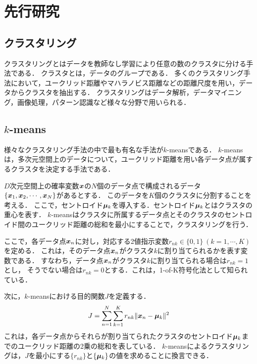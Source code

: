 \section{先行研究}

\subsection{クラスタリング}
クラスタリングとはデータを教師なし学習により任意の数のクラスタに分ける手法である．
クラスタとは，データのグループである．
多くのクラスタリング手法において，ユークリッド距離やマハラノビス距離などの距離尺度を用い，データからクラスタを抽出する．
クラスタリングはデータ解析，データマイニング，画像処理，パターン認識など様々な分野で用いられる．

\subsection{$k$-means}
様々なクラスタリング手法の中で最も有名な手法が$k$-meansである．
$k$-means\cite{k-means}は，多次元空間上のデータについて，ユークリッド距離を用い各データ点が属するクラスタを決定する手法である．

$D$次元空間上の確率変数$\boldsymbol{x}$の$N$個のデータ点で構成されるデータ
$\{\boldsymbol{x}_1, \boldsymbol{x}_2, \cdots, \boldsymbol{x}_N\}$があるとする．
このデータを$K$個のクラスタに分割することを考える．
ここで，セントロイド$\boldsymbol{\mu}_k$を導入する．セントロイド$\boldsymbol{\mu}_k$とはクラスタの重心を表す．
$k$-meansはクラスタに所属するデータ点とそのクラスタのセントロイド間のユークリッド距離の総和を最小にすることで，クラスタリングを行う．

ここで，各データ点$\boldsymbol{x}_n$に対し，対応する2値指示変数$r_{nk} \in \{0, 1\}\ (k = 1, \cdots, K)$を定める．
これは，そのデータ点$\boldsymbol{x}_n$がクラスタ$k$に割り当てられるかを表す変数である．
すなわち，データ点$\boldsymbol{x}_n$がクラスタ$k$に割り当てられる場合は$r_{nk}=1$とし，
そうでない場合は$r_{nk}=0$とする．これは，1-of-K符号化法として知られている．

次に，$k$-meansにおける目的関数$J$を定義する．
\begin{align}
  \label{eq:J-func}
  J = \sum_{n=1}^{N} \sum_{k=1}^{K} r_{nk} \| {\displaystyle \boldsymbol{x}_n - \boldsymbol{\mu}_k} \|^2
\end{align}
これは，各データ点からそれらが割り当てられたクラスタのセントロイド$\boldsymbol{\mu}_k$までのユークリッド距離の2乗の総和を表している．%
$k$-meansによるクラスタリングは，$J$を最小にする$\{r_{nk}\}$と$\{\boldsymbol{\mu}_k\}$の値を求めることに換言できる．

